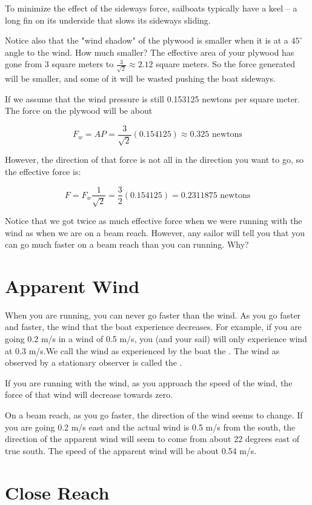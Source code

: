 To minimize the effect of the sideways force,  sailboats typically have  a keel -- a long fin on its underside that slows its sideways sliding.

Notice also that the "wind shadow" of the plywood is smaller when it is at a $45^\circ$ angle to the wind.  How much smaller?  The effective area of your plywood has 
gone from 3 square meters to $\frac{3}{\sqrt{2}} \approx 2.12$ square meters.   So the force generated will be smaller, and some of it will be wasted pushing the boat sideways.

If we assume that the wind pressure is still 0.153125 newtons per square meter.  The force on the plywood will be about

$$F_w = A P = \frac{3}{\sqrt{2}}(0.154125) \approx 0.325 \text{ newtons}$$

However,   the direction of that force is not all in the direction you want to go,  so the effective force is:

$$F = F_w \frac{1}{\sqrt{2}} =  \frac{3}{2}(0.154125) = 0.2311875 \text{ newtons}$$

Notice that we got twice as much effective force when we were running with the wind as when we are on a beam reach.   However,  any sailor will tell you that you can go much faster
on a beam reach than you can running.  Why?

\section{Apparent Wind}

When you are running,  you can never go faster than the wind.   As you go faster and faster,  the wind that the boat experience decreases.   For example,  if you are going 0.2 m/s in a wind 
of 0.5 m/s,  you (and your sail) will only experience wind at 0.3 m/s.We call the wind as experienced by the boat 
the .  The wind as observed by a stationary observer is called the .

If you are running with the wind,   as you approach the speed of the wind,  the force of that wind will decrease towards zero.

On a beam reach, as you go faster,  the direction of the wind seems to change.  If you are going 0.2 m/s east and the actual wind is 0.5 m/s from the south, the direction of the 
apparent wind will seem to come from about 22 degrees east of true south.  The speed of the apparent wind will be about 0.54 m/s.

\section{Close Reach}

